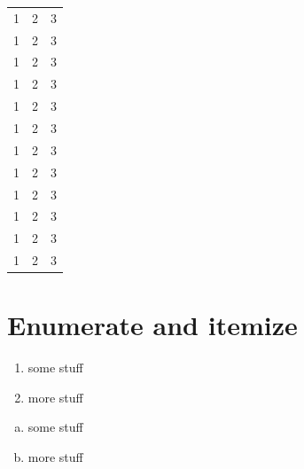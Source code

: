 \begin{center}
\begin{longtable}{l|l|l}
        1 & 2 & 3\\
        1 & 2 & 3\\
        1 & 2 & 3\\
        1 & 2 & 3\\
        1 & 2 & 3\\
        1 & 2 & 3\\
        1 & 2 & 3\\
        1 & 2 & 3\\
        1 & 2 & 3\\
        1 & 2 & 3\\
        1 & 2 & 3\\
        1 & 2 & 3
        
    \end{longtable}
\end{center}



\section{Enumerate and itemize}

\begin{enumerate}
\item some stuff
\item more stuff
\end{enumerate}

\begin{enumerate}[a)]
    \item some stuff
    \item more stuff
\end{enumerate}